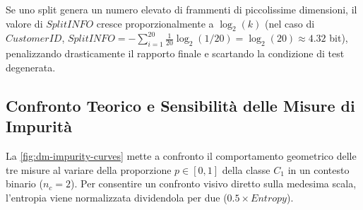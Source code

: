 Se uno split genera un numero elevato di frammenti di piccolissime dimensioni, il valore di $SplitINFO$ cresce proporzionalmente a $\log_2(k)$ (nel caso di $Customer ID$, $SplitINFO = -\sum_{i=1}^{20} \frac{1}{20}\log_2(1/20) = \log_2(20) \approx 4.32$ bit), penalizzando drasticamente il rapporto finale e scartando la condizione di test degenerata.

\FloatBarrier
\subsection{Confronto Teorico e Sensibilità delle Misure di Impurità}
\label{subsec:dm-impurity-comparison}

La \autoref{fig:dm-impurity-curves} mette a confronto il comportamento geometrico delle tre misure al variare della proporzione $p \in [0, 1]$ della classe $C_1$ in un contesto binario ($n_c = 2$). Per consentire un confronto visivo diretto sulla medesima scala, l'entropia viene normalizzata dividendola per due ($0.5 \times Entropy$).

